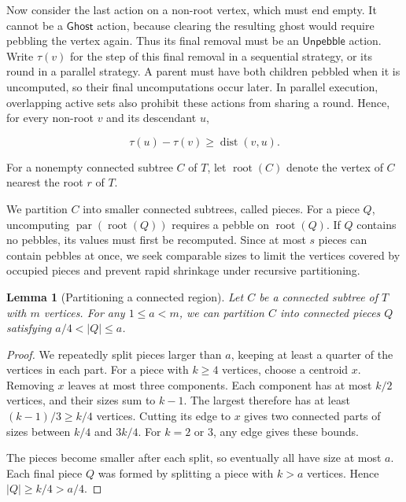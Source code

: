 \documentclass[11pt]{article}
\newtheorem{lemma}[lemma]{Lemma}
\theoremstyle{definition}
\theoremstyle{remark}
\DeclareMathOperator{\parv}{par}
\newcommand{\Unp}{\mathsf{Unpebble}}
\newcommand{\Ghost}{\mathsf{Ghost}}
\begin{document}
Now consider the last action on a non-root vertex, which must end empty. It cannot be a $\Ghost$ action, because clearing the resulting ghost would require pebbling the vertex again. Thus its final removal must be an $\Unp$ action. Write $\tau(v)$ for the step of this final removal in a sequential strategy, or its round in a parallel strategy. A parent must have both children pebbled when it is uncomputed, so their final uncomputations occur later. In parallel execution, overlapping active sets also prohibit these actions from sharing a round. Hence, for every non-root $v$ and its descendant $u$,

\begin{equation}
 \tau(u)-\tau(v)\ge\operatorname{dist}(v,u).
 \label{eq:final-removal}
\end{equation}

For a nonempty connected subtree $C$ of $T$, let $\operatorname{root}(C)$
denote the vertex of $C$ nearest the root $r$ of $T$.

We partition $C$ into smaller connected subtrees, called pieces.
For a piece $Q$, uncomputing $\parv(\operatorname{root}(Q))$
requires a pebble on $\operatorname{root}(Q)$. If $Q$ contains no pebbles, its values must
first be recomputed. Since at most $s$ pieces can contain
pebbles at once, we seek comparable sizes to limit the vertices
covered by occupied pieces and prevent rapid shrinkage under
recursive partitioning.

\begin{lemma}[Partitioning a connected region]
\label{lem:partition}
Let $C$ be a connected subtree of $T$ with $m$ vertices.
For any $1\le a<m$, we can partition $C$ into connected
pieces $Q$ satisfying $a/4<|Q|\le a$.
\end{lemma}

\begin{proof}
We repeatedly split pieces larger than $a$, keeping at least
a quarter of the vertices in each part. For a piece with
$k\ge4$ vertices, choose a centroid $x$. Removing $x$ leaves
at most three components. Each component has at most $k/2$ vertices, and their sizes sum to $k-1$.
The largest therefore has at least $(k-1)/3\ge k/4$ vertices.
Cutting its edge to $x$ gives two connected parts of sizes between $k/4$ and $3k/4$.
For $k=2$ or $3$, any edge gives these bounds.

The pieces become smaller after each split, so eventually
all have size at most $a$. Each final piece $Q$ was formed
by splitting a piece with $k>a$ vertices.
Hence $|Q|\ge k/4>a/4$.
\end{proof}
\end{document}
